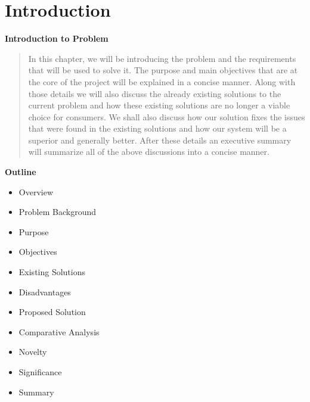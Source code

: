 \section{Introduction}

\vspace{20mm}

\Huge{\textbf{Introduction to Problem}}

\vspace{20mm}


\begin{abstract}
	In this chapter, we will be introducing the problem and the requirements that will be used to solve it. The purpose and main objectives that are at the core of the project will be explained in a concise manner. Along with those details we will also discuss the already existing solutions to the current problem and how these existing solutions are no longer a viable choice for consumers. We shall also discuss how our solution fixes the issues that were found in the existing solutions and how our system will be a superior and generally better. After these details an executive summary will summarize all of the above discussions into a concise manner.
\end{abstract}

\vspace{20mm}






\large{\textbf{Outline}}

\begin{center}
	\begin{itemize}
		
		\item Overview
		\item Problem Background
		\item Purpose
		\item Objectives
		\item Existing Solutions
		\item Disadvantages
		\item Proposed Solution
		\item Comparative Analysis
		\item Novelty
		\item Significance
		\item Summary
	\end{itemize}
\end{center}
\pagebreak








